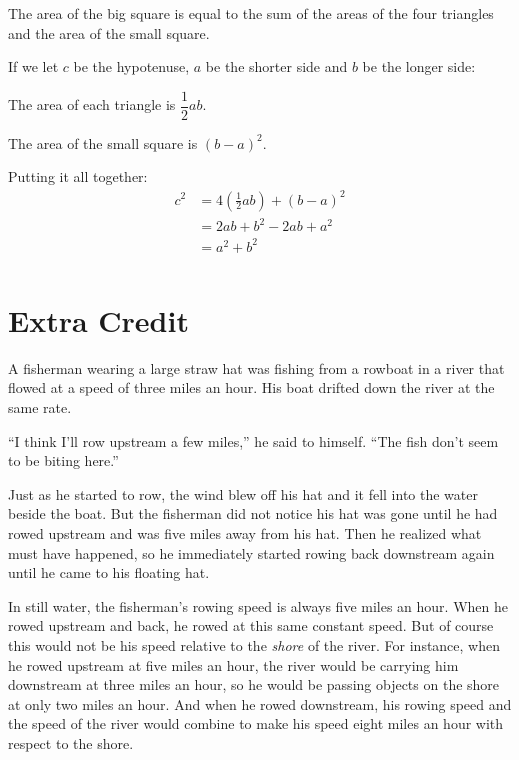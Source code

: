 \documentclass[fleqn,addpoints]{exam}
\begin{document}
\begin{questions}
\begin{solution}
The area of the big square is equal to the sum of the areas of the four triangles and the area of the small square.

If we let $c$ be the hypotenuse, $a$ be the shorter side and $b$ be the longer side:

\begin{itemize*}
  \item The area of each triangle is $ \dfrac{1}{2} ab $. 
  \item The area of the small square is $ (b - a)^2 $. 
\end{itemize*}

Putting it all together:
\begin{align*}
  c^2 &= 4 \left( \frac{1}{2} ab \right) + (b - a)^2 \\
      &= 2ab + b^2 - 2ab + a^2 \\
      &= a^2 + b^2 \\
\end{align*}

\end{solution}

\ifprintanswers
\else
\pagebreak
\fi
\section{Extra Credit}

\question

A fisherman wearing a large straw hat was fishing from a rowboat in a river that flowed at a speed of three miles an
hour.  His boat drifted down the river at the same rate.

``I think I'll row upstream a few miles,'' he said to himself.  ``The fish don't seem to be biting here.''

Just as he started to row, the wind blew off his hat and it fell into the water beside the boat.  But the fisherman did
not notice his hat was gone until he had rowed upstream and was five miles away from his hat.  Then he realized what
must have happened, so he immediately started rowing back downstream again until he came to his floating hat.

In still water, the fisherman's rowing speed is always five miles an hour.  When he rowed upstream and back, he rowed at
this same constant speed.  But of course this would not be his speed relative to the {\em shore} of the river.  For
instance, when he rowed upstream at five miles an hour, the river would be carrying him downstream at three miles an
hour, so he would be passing objects on the shore at only two miles an hour.  And when he rowed downstream, his rowing
speed and the speed of the river would combine to make his speed eight miles an hour with respect to the shore.


\end{questions}
\end{document}
